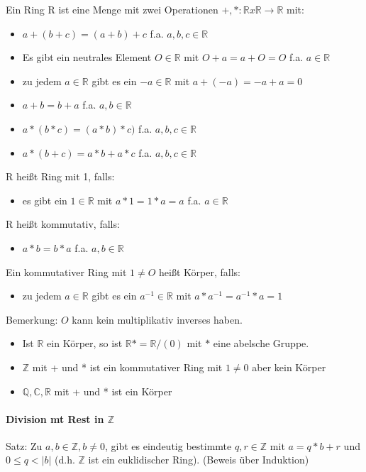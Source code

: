 \documentclass[a4paper]{article}
\begin{document}
\begin{multicols}{3}
    Ein Ring R ist eine Menge mit zwei Operationen $+,*: \mathbb{R} x \mathbb{R} \rightarrow \mathbb{R}$ mit:
    \begin{itemize}
        \item $a+(b+c) = (a+b)+c$ f.a. $a,b,c\in \mathbb{R}$
        \item Es gibt ein neutrales Element $O\in \mathbb{R}$ mit $O+a=a+O=O$ f.a. $a\in\mathbb{R}$
        \item zu jedem $a\in \mathbb{R}$ gibt es ein $-a\in \mathbb{R}$ mit $a+(-a)=-a+a=0$
        \item $a+b=b+a$ f.a. $a,b\in\mathbb{R}$
        \item $a*(b*c)=(a*b)*c)$ f.a. $a,b,c\in\mathbb{R}$
        \item $a*(b+c)=a*b+a*c$ f.a. $a,b,c\in\mathbb{R}$
    \end{itemize}
    R heißt Ring mit 1, falls:
    \begin{itemize} 
        \item es gibt ein $1\in\mathbb{R}$ mit $a*1=1*a=a$ f.a. $a\in\mathbb{R}$
    \end{itemize}
    R heißt kommutativ, falls:
    \begin{itemize}
        \item $a*b=b*a$ f.a. $a,b\in\mathbb{R}$
    \end{itemize}
    Ein kommutativer Ring mit $1\not=O$ heißt Körper, falls:
    \begin{itemize}
        \item zu jedem $a\in\mathbb{R}$ gibt es ein $a^{-1}\in\mathbb{R}$ mit $a*a^{-1}=a^{-1}*a=1$
    \end{itemize}
    
    Bemerkung: $O$ kann kein multiplikativ inverses haben.
    \begin{itemize}
        \item Ist $\mathbb{R}$ ein Körper, so ist $\mathbb{R}*=\mathbb{R} /(0)$ mit $*$ eine abelsche Gruppe.
        \item $\mathbb{Z}$ mit + und * ist ein kommutativer Ring mit $1 \not= 0$ aber kein Körper
        \item $\mathbb{Q}, \mathbb{C}, \mathbb{R}$ mit + und * ist ein Körper
    \end{itemize}
    
    \paragraph{Division mt Rest in $\mathbb{Z}$}
    Satz: Zu $a,b\in\mathbb{Z}, b \not= 0$, gibt es eindeutig bestimmte $q,r\in \mathbb{Z}$ mit $a=q*b+r$ und $0\leq q <|b|$ (d.h. $\mathbb{Z}$ ist ein euklidischer Ring). (Beweis über Induktion)
    

\end{multicols}
\end{document}
